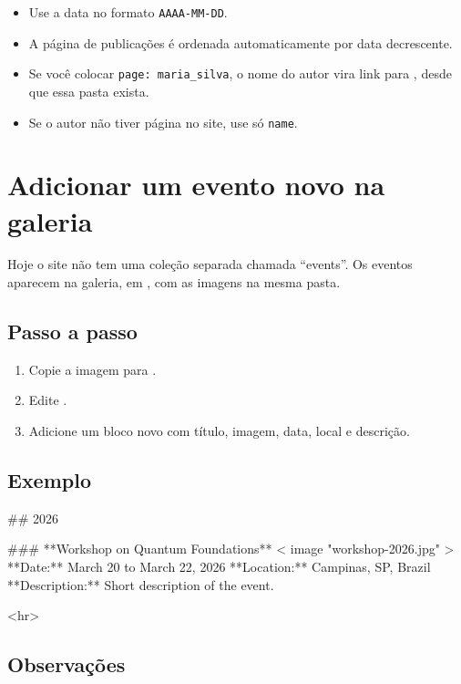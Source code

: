 \documentclass[11pt,a4paper]{article}
\begin{document}
\begin{itemize}
  \item Use a data no formato \texttt{AAAA-MM-DD}.
  \item A página de publicações é ordenada automaticamente por data decrescente.
  \item Se você colocar \texttt{page: maria\_silva}, o nome do autor vira link para , desde que essa pasta exista.
  \item Se o autor não tiver página no site, use só \texttt{name}.
\end{itemize}

\section{Adicionar um evento novo na galeria}

Hoje o site não tem uma coleção separada chamada ``events''. Os eventos aparecem na galeria, em
, com as imagens na mesma pasta.

\subsection{Passo a passo}

\begin{enumerate}
  \item Copie a imagem para .
  \item Edite .
  \item Adicione um bloco novo com título, imagem, data, local e descrição.
\end{enumerate}

\subsection{Exemplo}

\begin{terminal}
## 2026

### **Workshop on Quantum Foundations**
{{< image "workshop-2026.jpg" >}}
**Date:** March 20 to March 22, 2026
**Location:** Campinas, SP, Brazil
**Description:** Short description of the event.

<hr>
\end{terminal}

\subsection{Observações}
\end{document}
